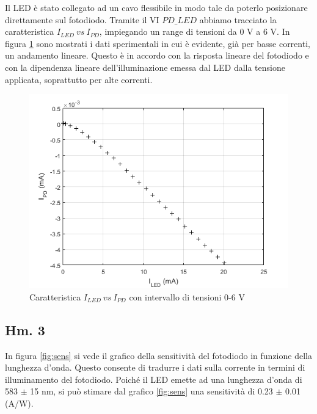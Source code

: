 \documentclass[journal, a4paper]{IEEEtran}
\begin{document}
Il LED è stato collegato ad un cavo flessibile in modo tale da poterlo posizionare direttamente sul fotodiodo. Tramite il VI \texttt{$PD\_LED$} abbiamo tracciato la caratteristica $I_{LED}~ vs~I_{PD}$, impiegando un range di tensioni da 0 V a 6 V. In figura \ref{fig:es8} sono mostrati i dati sperimentali in cui è evidente, già per basse correnti, un andamento lineare. Questo è in accordo con la risposta lineare del fotodiodo e con la dipendenza lineare dell'illuminazione emessa dal LED dalla tensione applicata, soprattutto per alte correnti.

\begin{figure}[htp]
\centering
\includegraphics[scale=.5]{es8_0-6_30mis_mejo}
\caption{Caratteristica $I_{LED}~ vs~I_{PD}$ con intervallo di tensioni 0-6 V}
\label{fig:es8}
\end{figure}

\subsection{Hm. 3}
In figura \ref{fig:sens} si vede il grafico della sensitività del fotodiodo in funzione della lunghezza d'onda. Questo consente di tradurre i dati sulla corrente in termini di illuminamento del fotodiodo. Poiché il LED emette ad una lunghezza d'onda di 583 $\pm$ 15 nm, si può stimare dal grafico \ref{fig:sens} una sensitività di 0.23 $\pm$ 0.01 (A/W). 
\end{document}
